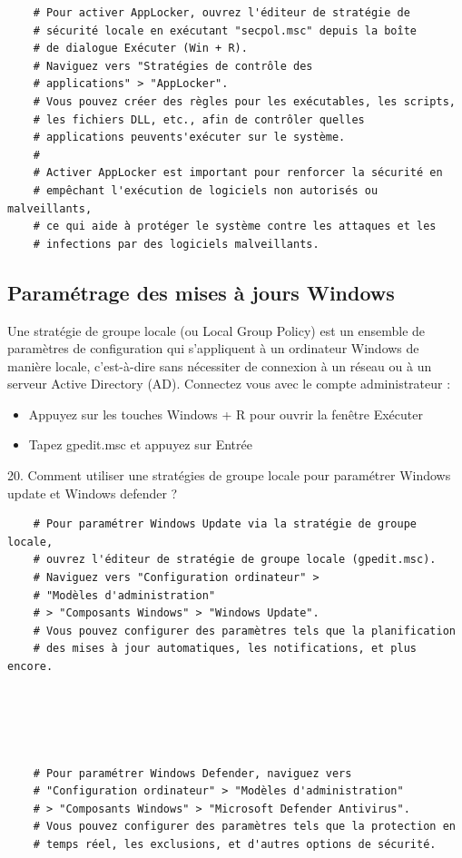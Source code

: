 \begin{center}
  \begin{verbatim}
    # Pour activer AppLocker, ouvrez l'éditeur de stratégie de
    # sécurité locale en exécutant "secpol.msc" depuis la boîte
    # de dialogue Exécuter (Win + R).
    # Naviguez vers "Stratégies de contrôle des 
    # applications" > "AppLocker".
    # Vous pouvez créer des règles pour les exécutables, les scripts,
    # les fichiers DLL, etc., afin de contrôler quelles
    # applications peuvents'exécuter sur le système.
    #
    # Activer AppLocker est important pour renforcer la sécurité en
    # empêchant l'exécution de logiciels non autorisés ou malveillants,
    # ce qui aide à protéger le système contre les attaques et les
    # infections par des logiciels malveillants.
  \end{verbatim}
\end{center}

\subsection*{Paramétrage des mises à jours Windows}
{}
\noindent Une stratégie de groupe locale (ou Local Group Policy) est un ensemble de paramètres de configuration qui s'appliquent à un ordinateur Windows de manière locale, c'est-à-dire sans nécessiter de connexion à un réseau ou à un serveur Active Directory (AD).
Connectez vous avec le compte administrateur : 
\begin{itemize}
  \item Appuyez sur les touches Windows + R pour ouvrir la fenêtre Exécuter
  \item Tapez gpedit.msc et appuyez sur Entrée
\end{itemize}

\vspace{0.5cm}

20. Comment utiliser une stratégies de groupe locale pour paramétrer Windows update et Windows defender ?

\begin{center}
  \begin{verbatim}
    # Pour paramétrer Windows Update via la stratégie de groupe locale,
    # ouvrez l'éditeur de stratégie de groupe locale (gpedit.msc).
    # Naviguez vers "Configuration ordinateur" >
    # "Modèles d'administration"
    # > "Composants Windows" > "Windows Update".
    # Vous pouvez configurer des paramètres tels que la planification
    # des mises à jour automatiques, les notifications, et plus encore.
    
    
    
    
    
    # Pour paramétrer Windows Defender, naviguez vers
    # "Configuration ordinateur" > "Modèles d'administration"
    # > "Composants Windows" > "Microsoft Defender Antivirus".
    # Vous pouvez configurer des paramètres tels que la protection en
    # temps réel, les exclusions, et d'autres options de sécurité.
  \end{verbatim}
\end{center}

